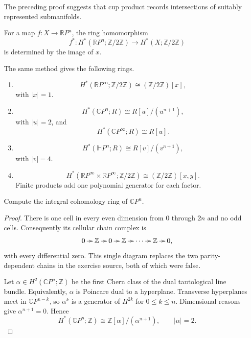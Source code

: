 \begin{remark}
\label{at-remark-cup-intersection}
The preceding proof suggests that cup
product records intersections of suitably
represented submanifolds.
\end{remark}

\begin{remark}
\label{at-remark-map-to-projective-space}
For a map $f:X\to\mathbb{R}P^n$, the ring
homomorphism
$$
f^*:H^*(\mathbb{R}P^n;
\mathbb{Z}/2\mathbb{Z})
\longrightarrow H^*(X;
\mathbb{Z}/2\mathbb{Z})
$$
is determined by the image of $x$.
\end{remark}

\begin{remarks}
\label{at-remarks-projective-rings}
The same method gives the following rings.
\begin{enumerate}
\item
$$
H^*(\mathbb{R}P^\infty;
\mathbb{Z}/2\mathbb{Z})
\cong(\mathbb{Z}/2\mathbb{Z})[x],
$$
with $|x|=1$.
\item
$$
H^*(\mathbb{C}P^n;R)
\cong R[u]/(u^{n+1}),
$$
with $|u|=2$, and
$$
H^*(\mathbb{C}P^\infty;R)
\cong R[u].
$$
\item
$$
H^*(\mathbb{H}P^n;R)
\cong R[v]/(v^{n+1}),
$$
with $|v|=4$.
\item
$$
H^*(\mathbb{R}P^\infty
\times\mathbb{R}P^\infty;
\mathbb{Z}/2\mathbb{Z})
\cong
(\mathbb{Z}/2\mathbb{Z})[x,y].
$$
Finite products add one polynomial
generator for each factor.
\end{enumerate}
\end{remarks}

\begin{exercise}
Compute the integral cohomology ring of
$\mathbb{C}P^n$.
\end{exercise}

\begin{proof}
There is one cell in every even dimension
from $0$ through $2n$ and no odd cells.
Consequently its cellular chain complex is
$$
\xymatrix@C=.8em{
0\ar[r]&\mathbb{Z}\ar[r]
&0\ar[r]&\mathbb{Z}\ar[r]
&\cdots\ar[r]&\mathbb{Z}\ar[r]&0,
}
$$
with every differential zero.  This single
diagram replaces the two parity-dependent
chains in the exercise source, both of which
were false.

Let $\alpha\in H^2(\mathbb{C}P^n;\mathbb{Z})$
be the first Chern class of the dual
tautological line bundle.  Equivalently,
$\alpha$ is Poincare dual to a hyperplane.
Transverse hyperplanes meet in
$\mathbb{C}P^{n-k}$, so $\alpha^k$ is a
generator of $H^{2k}$ for $0\leq k\leq n$.
Dimensional reasons give $\alpha^{n+1}=0$.
Hence
$$
H^*(\mathbb{C}P^n;\mathbb{Z})
\cong
\mathbb{Z}[\alpha]/(\alpha^{n+1}),
\qquad |\alpha|=2.
$$
\end{proof}



